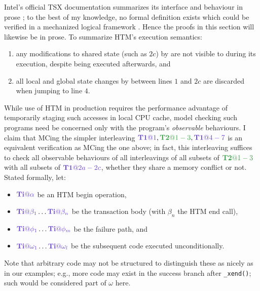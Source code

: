 Intel's official TSX documentation summarizes its interface and behaviour in prose \cite{intel-tsx-overview};
to the best of my knowledge,
no formal definition exists which could be verified in a mechanized logical framework \cite{x86-semantics}.
Hence the proofs in this section will likewise be in prose.
To summarize HTM's execution semantics:

\begin{enumerate}
	\item any modifications to shared state (such as $2c$) by \ti are not visible to \tj during its execution,
		despite \tj being executed afterwards, and
	\item all local and global state changes by \ti between lines $1$ and $2c$ are discarded when jumping to line $4$.
\end{enumerate}

While use of HTM in production requires the performance advantage
of temporarily staging such accesses in local CPU cache,
model checking such programs need be concerned only with the program's {\em observable} behaviours.
I claim that MCing the simpler interleaving $\tiat{1}, \tjat{1-3}, \tiat{4-7}$
is an equivalent verification as MCing the one above;
in fact, this interleaving suffices to check
all observable behaviours
of all interleavings
of all subsets of $\tjat{1-3}$
with all subsets of $\tiat{2a-2c}$,
whether they share a memory conflict or not.
Stated formally, let:

\newcommand\tii{\ensuremath{\hilight{lavender}{\mathbf{Ti}}}\xspace}
\newcommand\tjj{\ensuremath{\hilight{seafoam}{\mathbf{Tj}}}\xspace}
\newcommand\tkk{\ensuremath{\hilight{salmon}{\mathbf{Tk}}}\xspace}

\newcommand\tiiat[1]{\ensuremath{\hilight{lavender}{\mathbf{Ti}@#1}}\xspace}
\newcommand\tjjat[1]{\ensuremath{\hilight{seafoam} {\mathbf{Tj}@#1}}\xspace}
\newcommand\tkkat[1]{\ensuremath{\hilight{salmon}  {\mathbf{Tk}@#1}}\xspace}

\begin{itemize}
	\item $\tiiat{\alpha}$ be an HTM begin operation,
	\item $\tiiat{\beta_1}\dots\tiiat{\beta_n}$ be the transaction body (with $\beta_n$ the HTM end call),
	\item $\tiiat{\phi_1}\dots\tiiat{\phi_m}$ be the failure path, and
	\item $\tiiat{\omega_1}\dots\tiiat{\omega_l}$ be the subsequent code executed unconditionally.
\end{itemize}
Note that arbitrary code may not be structured to distinguish these as nicely as in our examples;
e.g., more code may exist in the success branch after {\tt \_xend()};
such would be considered part of $\omega$ here.

